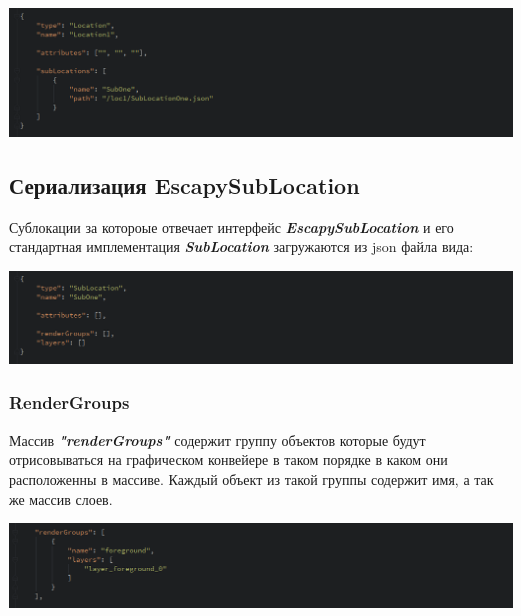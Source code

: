 \documentclass[11pt]{report}
\begin{document}
\begin{center}
	\includegraphics[width=1.2\linewidth]{img/17.png} 
  	\label{img:170} 
\end{center} 

\subsection{Сериализация EscapySubLocation}
Сублокации за котороые отвечает интерфейс \textit{\textbf{EscapySubLocation}} и его стандартная имплементация \textit{\textbf{SubLocation}} загружаются из json файла вида:
\begin{center}
	\includegraphics[width=1.2\linewidth]{img/18.png} 
  	\label{img:180} 
\end{center} 

\subsubsection{RenderGroups}
Массив \textit{\textbf{"renderGroups"}} содержит группу объектов которые будут отрисовываться на графическом конвейере в таком порядке в каком они расположенны в массиве. Каждый объект из такой группы содержит имя, а так же массив слоев.
\begin{center}
	\includegraphics[width=1.2\linewidth]{img/19.png} 
  	\label{img:190} 
\end{center} 
\end{document}
